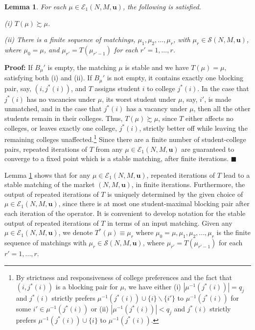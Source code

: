 \documentclass[12pt, fullpage]{amsart}
\newtheorem{lemma}{Lemma}[section]
\theoremstyle{definition}
\theoremstyle{definition}
\theoremstyle{definition}
\begin{document}
\begin{bibunit}[econometrica]
\begin{lemma}\label{DA_as_monotone_operator} For each $\mu\in\mathcal{E}_1(N,M,\boldsymbol{u})$, the following is satisfied.
	
	(i) $T(\mu)\succsim\mu$.
	
	(ii) There is a finite sequence of matchings, $\mu_{1},\mu_{2},...,\mu_{r}$, with
	$\mu_{r}\in\mathcal{S}(N,M,\boldsymbol{u})$, where $\mu_0 = \mu$, and $\mu_{r'}=T(\mu_{r'-1})$
	for each $r'=1,...,r$.
\end{lemma}

\noindent \textbf{Proof: }If $B_{\mu}'$ is empty, the matching $\mu$ 
is stable and we have $T(\mu)=\mu,$ satisfying both (i) and (ii). If
$B_{\mu}'$ is not empty, it contains exactly one blocking pair, say, $(i,j^{*}(i))$,
and $T$ assigns student $i$ to college $j^{*}(i)$. In the case
that $j^{*}(i)$ has no vacancies under $\mu$, its worst student
under $\mu$, say, $i'$, is made unmatched, and in the case that $j^{*}(i)$ has a vacancy under $\mu$, then all the other students remain in their colleges. Thus, $T(\mu)\succsim\mu$,
since $T$ either affects no colleges, or leaves exactly one college,
$j^{*}(i)$, strictly better off while leaving the remaining colleges
unaffected.\footnote{By strictness and responsiveness of college preferences and the fact
	that $(i,j^{*}(i))$ is a blocking pair for $\mu$, we have either
	(i) $|\mu^{-1}(j^{*}(i))|=q_{j}$ and $j^{*}(i)$ strictly prefers
	$\mu^{-1}(j^{*}(i))\cup\{i\}\backslash\{i'\}$ to $\mu^{-1}(j^{*}(i))$
	for some $i'\in\mu^{-1}(j^{*}(i))$ or (ii) $|\mu^{-1}(j^{*}(i))|<q_{j}$
	and $j^{*}(i)$ strictly prefers $\mu^{-1}(j^{*}(i))\cup\{i\}$ to
	$\mu^{-1}(j^{*}(i))$.} Since there are a finite number of student-college pairs, repeated iterations
of $T$ from any $\mu\in\mathcal{E}_1(N,M,\boldsymbol{u})$ are guaranteed
to converge to a fixed point which is a stable matching, after finite iterations. $\blacksquare$

\medskip{}

Lemma \ref{DA_as_monotone_operator} shows that for any $\mu\in\mathcal{E}_1(N,M,\boldsymbol{u})$,
repeated iterations of $T$ lead to a stable matching of the market
$(N,M,\boldsymbol{u})$, in finite iterations. Furthermore, the output of repeated iterations of $T$ is uniquely determined by the given choice of $\mu\in\mathcal{E}_1(N,M,\boldsymbol{u})$, since there is at most one student-maximal blocking pair after each iteration of the operator.  It is convenient to develop notation for the stable output of
repeated iterations of $T$ in terms of an input matching. Given any
$\mu\in\mathcal{E}_1(N,M,\boldsymbol{u})$, we denote $T^{*}(\mu)\equiv\mu_{r}$
where  $\mu_{0}=\mu,\mu_{1},\mu_{2},...,\mu_{r}$ is the finite sequence
of matchings with $\mu_{r}\in\mathcal{S}(N,M,\boldsymbol{u})$, where
$\mu_{r'}=T(\mu_{r'-1})$ for each $r'=1,...,r$.


\end{bibunit}
\end{document}
